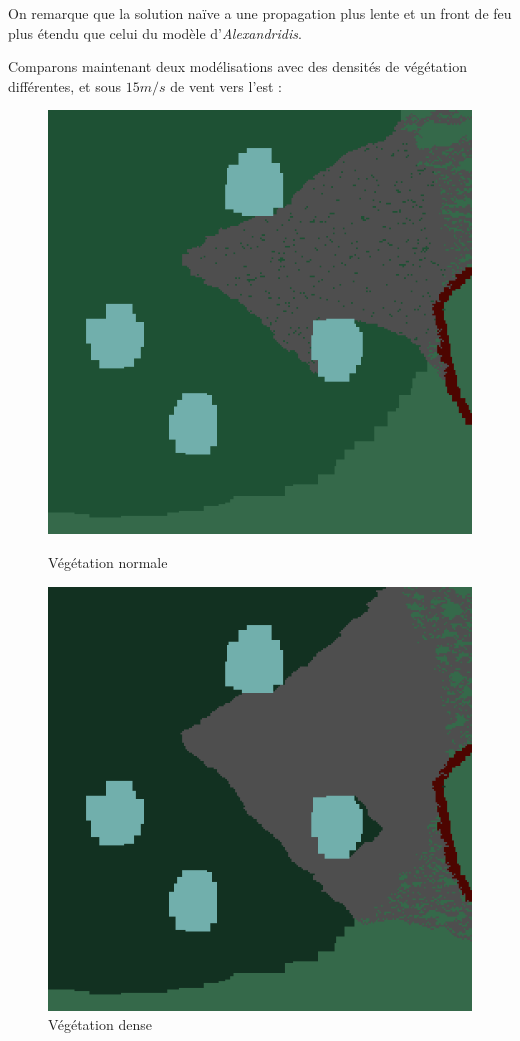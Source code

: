 \documentclass[12pt]{article}
\begin{document}
On remarque que la solution naïve a une propagation plus lente et un front de feu plus étendu que celui du modèle d'\textit{Alexandridis}.

Comparons maintenant deux modélisations avec des densités de végétation différentes, et sous $15 m/s$ de vent vers l'est :

\begin{figure}[!h]
    \centering
    \begin{minipage}{0.35\textwidth}
      \centering
      \includegraphics[width=.8\linewidth]{pictures/model2/land_200_wind_notdense.png}
      \caption{Végétation normale}\label{Fig:Data1}
    \end{minipage}\hfil
    \begin{minipage}{0.35\textwidth}
      \centering
      \includegraphics[width=.8\linewidth]{pictures/model2/land_200_wind_dense.png}
      \caption{Végétation dense}\label{Fig:Data2}
    \end{minipage}
 \end{figure}
\end{document}
